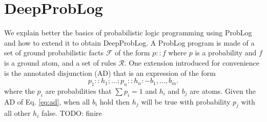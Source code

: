 \section{DeepProbLog}
We explain better the basics of probabilistic logic programming using ProbLog and how to extend it to obtain DeepProbLog.
A ProbLog program is made of a set of ground probabilistic facts $\mathcal{F}$ of the form $p :: f$ where $p$ is a probability and $f$ is a ground atom, and a set of rules $\mathcal{R}$.
One extension introduced for convenience is the annotated disjunction (AD) that is an expression of the form 
\begin{equation}
\label{eq:ad}
    p_1 :: h_1 ; \dots ; p_n :: h_n {:-} b_1, \dots, b_m.
\end{equation}
where the $p_i$ are probabilities that $\sum{}{}{p_i} = 1$ and $h_i$ and $b_j$ are atoms. Given the AD of Eq. \ref{eq:ad}, when all $b_i$ hold then $h_j$ will be true with probability $p_j$ with all other $h_i$ false.
TODO: finire

